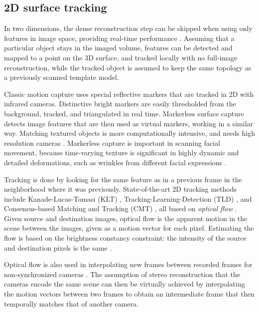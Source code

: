 
\subsection{2D surface tracking} %


In two dimensions, the dense reconstruction step can be skipped when using only features in image space, providing real-time performance \cite{pilet2005real}.
Assuming that a particular object stays in the imaged volume, features can be detected and mapped to a point on the 3D surface, and tracked locally with no full-image reconstruction, while the tracked object is assumed to keep the same topology as a previously scanned template model.

Classic motion capture uses special reflective markers that are tracked in 2D with infrared cameras.
Distinctive bright markers are easily thresholded from the background, tracked, and triangulated in real time.
Markerless surface capture detects image features that are then used as virtual markers, working in a similar way.
Matching textured objects is more computationally intensive, and needs high resolution cameras \cite{moeslund2001survey}.
Markerless capture is important in scanning facial movement, because time-varying texture is significant in highly dynamic and detailed deformations, such as wrinkles from different facial expressions \cite{bradley2008markerless,beeler2011high,bradley2010high}.

Tracking is done by looking for the same feature as in a previous frame in the neighborhood where it was previously.
State-of-the-art 2D tracking methods include Kanade-Lucas-Tomasi (KLT) \cite{lucas1981iterative,tomasi1991detection}, Tracking-Learning-Detection (TLD) \cite{kalal2012tracking}, and Consensus-based Matching and Tracking (CMT) \cite{nebehay2014consensus}, all based on \emph{optical flow} \cite{horn1981determining,gibson1950perception,beauchemin1995computation}.
Given source and destination images, optical flow is the apparent motion in the scene between the images, given as a motion vector for each pixel.
Estimating the flow is based on the brightness constancy constraint: the intensity of the source and destination pixels is the same \cite{horn1974determining}.

Optical flow is also used in interpolating new frames between recorded frames for non-synchronized cameras \cite{bradley2009synchronization,eugster2011slowmovideo}.
The assumption of stereo reconstruction that the cameras encode the same scene can then be virtually achieved by interpolating the motion vectors between two frames to obtain an intermediate frame that then temporally matches that of another camera.

